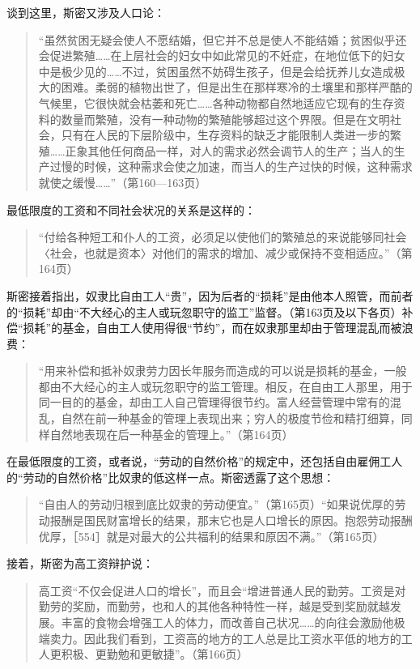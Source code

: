 谈到这里，斯密又涉及人口论：

\begin{quote}{“虽然贫困无疑会使人不愿结婚，但它并不总是使人不能结婚；贫困似乎还会促进繁殖……在上层社会的妇女中如此常见的不妊症，在地位低下的妇女中是极少见的……不过，贫困虽然不妨碍生孩子，但是会给抚养儿女造成极大的困难。柔弱的植物出世了，但是出生在那样寒冷的土壤里和那样严酷的气候里，它很快就会枯萎和死亡……各种动物都自然地适应它现有的生存资料的数量而繁殖，没有一种动物的繁殖能够超过这个界限。但是在文明社会，只有在人民的下层阶级中，生存资料的缺乏才能限制人类进一步的繁殖……正象其他任何商品一样，对人的需求必然会调节人的生产；当人的生产过慢的时候，这种需求会使之加速，而当人的生产过快的时候，这种需求就使之缓慢……”（第160—163页）}\end{quote}

最低限度的工资和不同社会状况的关系是这样的：

\begin{quote}{“付给各种短工和仆人的工资，必须足以使他们的繁殖总的来说能够同社会〈社会，也就是资本〉对他们的需求的增加、减少或保持不变相适应。”（第164页）}\end{quote}

斯密接着指出，奴隶比自由工人“贵”，因为后者的“损耗”是由他本人照管，而前者的“损耗”却由“不大经心的主人或玩忽职守的监工”监督。（第163页及以下各页）补偿“损耗”的基金，自由工人使用得很“节约”，而在奴隶那里却由于管理混乱而被浪费：

\begin{quote}{“用来补偿和抵补奴隶劳力因长年服务而造成的可以说是损耗的基金，一般都由不大经心的主人或玩忽职守的监工管理。相反，在自由工人那里，用于同一目的的基金，却由工人自己管理得很节约。富人经营管理中常有的混乱，自然在前一种基金的管理上表现出来；穷人的极度节俭和精打细算，同样自然地表现在后一种基金的管理上。”（第164页）}\end{quote}

在最低限度的工资，或者说，“劳动的自然价格”的规定中，还包括自由雇佣工人的“劳动的自然价格”比奴隶的低这样一点。斯密透露了这个思想：

\begin{quote}{“自由人的劳动归根到底比奴隶的劳动便宜。”（第165页）“如果说优厚的劳动报酬是国民财富增长的结果，那末它也是人口增长的原因。抱怨劳动报酬优厚，［554］就是对最大的公共福利的结果和原因不满。”（第165页）}\end{quote}

接着，斯密为高工资辩护说：

\begin{quote}{高工资“不仅会促进人口的增长”，而且会“增进普通人民的勤劳。工资是对勤劳的奖励，而勤劳，也和人的其他各种特性一样，越是受到奖励就越发展。丰富的食物会增强工人的体力，而改善自己状况……的向往会激励他极端卖力。因此我们看到，工资高的地方的工人总是比工资水平低的地方的工人更积极、更勤勉和更敏捷”。（第166页）}\end{quote}

